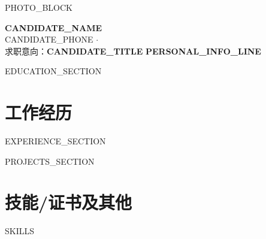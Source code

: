 \documentclass[10pt, a4paper]{article}
\begin{document}
{{PHOTO_BLOCK}}

\begin{center}
{\LARGE\bfseries {{CANDIDATE_NAME}}} \\[4pt]
\small\sloppy
{{CANDIDATE_PHONE}} \enspace $\cdot$  \\[2pt]
\small\sloppy
求职意向：\textbf{{{CANDIDATE_TITLE}}}\allowbreak \enspace \textbf{\color{grayText} {{PERSONAL_INFO_LINE}}}
\normalsize
\end{center}

\vspace{2.5pt}

{{EDUCATION_SECTION}}

\section{工作经历}
{{EXPERIENCE_SECTION}}

{{PROJECTS_SECTION}}


\section{技能/证书及其他}
{{SKILLS}}
\end{document}
